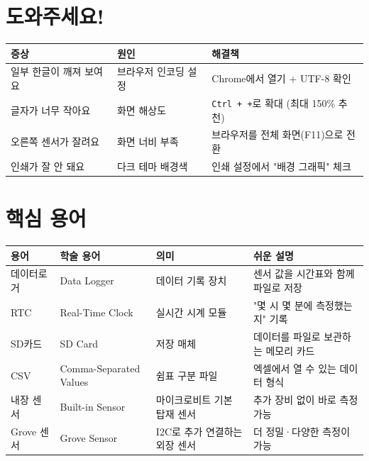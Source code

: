 \documentclass[11pt,a4paper]{article}
\begin{document}
\section*{ 도와주세요!}

\begin{center}
\renewcommand{\arraystretch}{1.4}
\begin{tabular}{|p{4.5cm}|p{3.9cm}|p{6.6cm}|}
\hline
\rowcolor{tableheader}
\textbf{증상} & \textbf{원인} & \textbf{해결책} \\
\hline
일부 한글이 깨져 보여요 & 브라우저 인코딩 설정 & Chrome에서 열기 + UTF-8 확인 \\
\hline
글자가 너무 작아요 & 화면 해상도 & \texttt{Ctrl + +}로 확대 (최대 150\% 추천) \\
\hline
오른쪽 센서가 잘려요 & 화면 너비 부족 & 브라우저를 전체 화면(F11)으로 전환 \\
\hline
인쇄가 잘 안 돼요 & 다크 테마 배경색 & 인쇄 설정에서 "배경 그래픽" 체크 \\
\hline
\end{tabular}
\end{center}


\section*{ 핵심 용어}

\begin{center}
\renewcommand{\arraystretch}{1.4}
\begin{tabular}{|p{1.5cm}|p{3.4cm}|p{4.5cm}|p{5.6cm}|}
\hline
\rowcolor{tableheader}
\textbf{용어} & \textbf{학술 용어} & \textbf{의미} & \textbf{쉬운 설명} \\
\hline
데이터로거 & Data Logger & 데이터 기록 장치 & 센서 값을 시간표와 함께 파일로 저장 \\
\hline
RTC & Real-Time Clock & 실시간 시계 모듈 & "몇 시 몇 분에 측정했는지" 기록 \\
\hline
SD카드 & SD Card & 저장 매체 & 데이터를 파일로 보관하는 메모리 카드 \\
\hline
CSV & Comma-Separated Values & 쉼표 구분 파일 & 엑셀에서 열 수 있는 데이터 형식 \\
\hline
내장 센서 & Built-in Sensor & 마이크로비트 기본 탑재 센서 & 추가 장비 없이 바로 측정 가능 \\
\hline
Grove 센서 & Grove Sensor & I2C로 추가 연결하는 외장 센서 & 더 정밀·다양한 측정이 가능 \\
\hline
\end{tabular}
\end{center}
\end{document}
